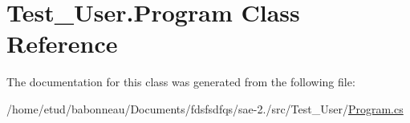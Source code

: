 \hypertarget{classTest__User_1_1Program}{}\section{Test\+\_\+\+User.\+Program Class Reference}
\label{classTest__User_1_1Program}


The documentation for this class was generated from the following file\+:\begin{DoxyCompactItemize}
\item 
/home/etud/babonneau/\+Documents/fdsfsdfqs/sae-\/2./src/\+Test\+\_\+\+User/\hyperlink{Test__User_2Program_8cs}{Program.\+cs}\end{DoxyCompactItemize}
